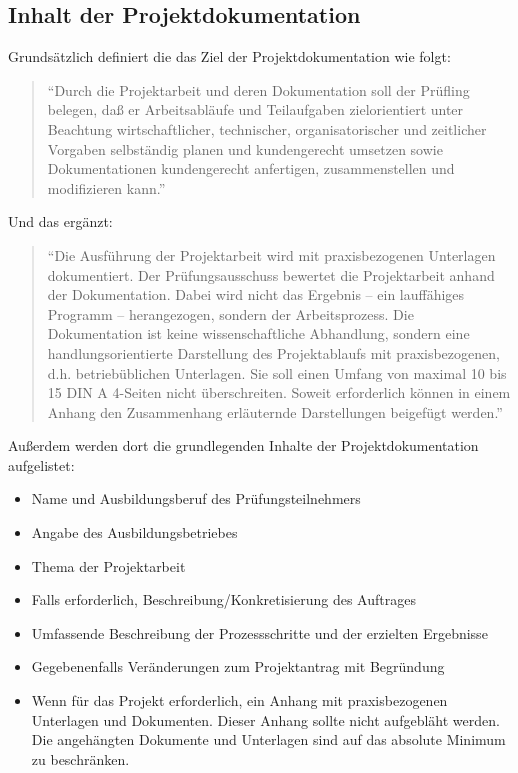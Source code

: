 \subsection*{Inhalt der Projektdokumentation}

Grundsätzlich definiert die \citet[S.~1746]{Bundesgesetzblatt48}\QuelleLiegtBei das Ziel der Projektdokumentation wie folgt:
\begin{quote}
"`Durch die Projektarbeit und deren Dokumentation soll der Prüfling belegen, daß er Arbeitsabläufe und Teilaufgaben zielorientiert unter
Beachtung wirtschaftlicher, technischer, organisatorischer und zeitlicher Vorgaben selbständig planen und kundengerecht umsetzen sowie
Dokumentationen kundengerecht anfertigen, zusammenstellen und modifizieren kann."'
\end{quote}

Und das \citet[S.~36]{BMBF2000}\QuelleLiegtBei ergänzt:
\begin{quote}
"`Die Ausführung der Projektarbeit wird mit praxisbezogenen Unterlagen dokumentiert.
Der Prüfungsausschuss bewertet die Projektarbeit anhand der Dokumentation. Dabei
wird nicht das Ergebnis -- \zB ein lauffähiges Programm -- herangezogen, sondern
der Arbeitsprozess. Die Dokumentation ist keine wissenschaftliche Abhandlung,
sondern eine handlungsorientierte Darstellung des Projektablaufs mit
praxisbezogenen, d.h. betriebüblichen Unterlagen. Sie soll einen Umfang von
maximal 10 bis 15 DIN A 4-Seiten nicht überschreiten. Soweit erforderlich können in
einem Anhang \zB den Zusammenhang erläuternde Darstellungen beigefügt werden."'
\end{quote}

Außerdem werden dort die grundlegenden Inhalte der Projektdokumentation aufgelistet:
\begin{itemize}
	\item Name und Ausbildungsberuf des Prüfungsteilnehmers
	\item Angabe des Ausbildungsbetriebes
	\item Thema der Projektarbeit
	\item Falls erforderlich, Beschreibung/Konkretisierung des Auftrages
	\item Umfassende Beschreibung der Prozessschritte und der erzielten Ergebnisse
	\item Gegebenenfalls Veränderungen zum Projektantrag mit Begründung
	\item Wenn für das Projekt erforderlich, ein Anhang mit praxisbezogenen Unterlagen und Dokumenten. Dieser Anhang sollte nicht
	aufgebläht werden. Die angehängten Dokumente und Unterlagen sind auf das absolute Minimum zu beschränken.
\end{itemize}

